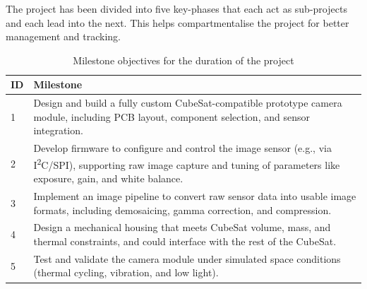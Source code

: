 The project has been divided into five key-phases that each act as sub-projects and each lead into the next. This helps compartmentalise the project for better management and tracking.
\begin{table}[H]
\centering
\begin{tabular}{|l|p{12cm}|}
\hline
\textbf{ID} & \textbf{Milestone} \\
\hline
1 & Design and build a fully custom CubeSat-compatible prototype camera module, including PCB layout, component selection, and sensor integration. \\
\hline
2 & Develop firmware to configure and control the image sensor (e.g., via I\textsuperscript{2}C/SPI), supporting raw image capture and tuning of parameters like exposure, gain, and white balance. \\
\hline
3 & Implement an image pipeline to convert raw sensor data into usable image formats, including demosaicing, gamma correction, and compression. \\
\hline
4 & Design a mechanical housing that meets CubeSat volume, mass, and thermal constraints, and could interface with the rest of the CubeSat. \\
\hline
5 & Test and validate the camera module under simulated space conditions (thermal cycling, vibration, and low light). \\
\hline
\end{tabular}
\caption{Milestone objectives for the duration of the project}
\label{tab:milestones}
\end{table}